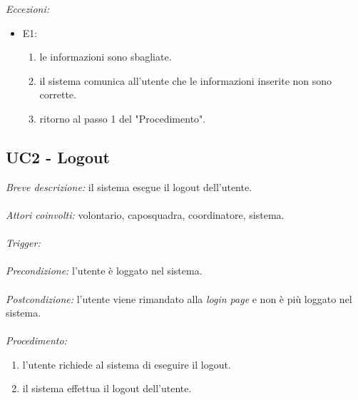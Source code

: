 \textit{Eccezioni:}
\begin{itemize}
	\item E1:
	\begin{enumerate}
		\item le informazioni sono sbagliate.
		\item il sistema comunica all'utente che le informazioni inserite non sono corrette.
		\item ritorno al passo 1 del "Procedimento".
	\end{enumerate}
\end{itemize}



\subsection{UC2 - Logout}
\textit{Breve descrizione:} il sistema esegue il logout dell'utente.
\\
\\
\textit{Attori coinvolti:} volontario, caposquadra, coordinatore, sistema.
\\
\\
\textit{Trigger:}
\\
\\
\textit{Precondizione:} l'utente è loggato nel sistema.
\\
\\
\textit{Postcondizione:} l'utente viene rimandato alla \textit{login page} e non è più loggato nel sistema.
\\
\\
\textit{Procedimento:}
\begin{enumerate}
	\item l'utente richiede al sistema di eseguire il logout.
	\item il sistema effettua il logout dell'utente.
\end{enumerate}



